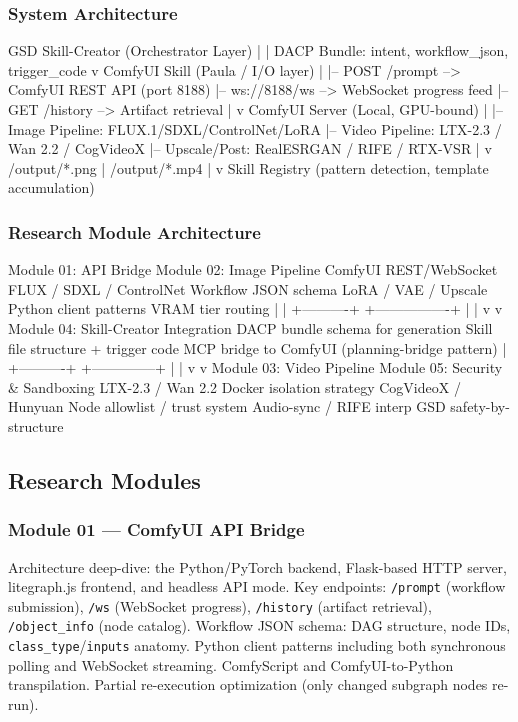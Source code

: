 \documentclass[11pt,letterpaper]{article}
\begin{document}
\subsubsection{System Architecture}

\begin{asciibox}
GSD Skill-Creator (Orchestrator Layer)
  |
  |  DACP Bundle: {intent, workflow_json, trigger_code}
  v
ComfyUI Skill (Paula / I/O layer)
  |
  |-- POST /prompt  --> ComfyUI REST API (port 8188)
  |-- ws://8188/ws  --> WebSocket progress feed
  |-- GET /history  --> Artifact retrieval
  |
  v
ComfyUI Server (Local, GPU-bound)
  |
  |-- Image Pipeline: FLUX.1/SDXL/ControlNet/LoRA
  |-- Video Pipeline: LTX-2.3 / Wan 2.2 / CogVideoX
  |-- Upscale/Post:  RealESRGAN / RIFE / RTX-VSR
  |
  v
/output/*.png | /output/*.mp4
  |
  v
Skill Registry (pattern detection, template accumulation)
\end{asciibox}

\subsubsection{Research Module Architecture}

\begin{asciibox}
Module 01: API Bridge        Module 02: Image Pipeline
  ComfyUI REST/WebSocket        FLUX / SDXL / ControlNet
  Workflow JSON schema           LoRA / VAE / Upscale
  Python client patterns        VRAM tier routing
        |                              |
        +----------+  +----------------+
                   |  |
                   v  v
         Module 04: Skill-Creator Integration
           DACP bundle schema for generation
           Skill file structure + trigger code
           MCP bridge to ComfyUI (planning-bridge pattern)
                   |
        +----------+  +--------------+
        |                            |
        v                            v
Module 03: Video Pipeline   Module 05: Security & Sandboxing
  LTX-2.3 / Wan 2.2            Docker isolation strategy
  CogVideoX / Hunyuan           Node allowlist / trust system
  Audio-sync / RIFE interp      GSD safety-by-structure
\end{asciibox}

\subsection{Research Modules}

\subsubsection{Module 01 --- ComfyUI API Bridge}
Architecture deep-dive: the Python/PyTorch backend, Flask-based HTTP server, litegraph.js
frontend, and headless API mode. Key endpoints: \texttt{/prompt} (workflow submission),
\texttt{/ws} (WebSocket progress), \texttt{/history} (artifact retrieval),
\texttt{/object\_info} (node catalog). Workflow JSON schema: DAG structure, node IDs,
\texttt{class\_type}/\texttt{inputs} anatomy. Python client patterns including both
synchronous polling and WebSocket streaming. ComfyScript and ComfyUI-to-Python
transpilation. Partial re-execution optimization (only changed subgraph nodes re-run).
\end{document}
